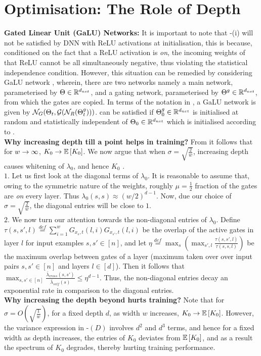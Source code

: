 \section{Optimisation: The Role of Depth}\label{sec:optimisation}
\textbf{Gated Linear Unit (GaLU) Networks:} It is important to note that -(i) will not be satisfied by DNN with ReLU activations at initialisation, this is because, conditioned on the fact that a ReLU activation is \emph{on}, the incoming weights of that ReLU cannot be all simultaneously negative, thus violating the statistical independence condition. However, this situation can be remedied by considering GaLU network \cite{sss}, wherein, there are two networks namely a main network, parameterised by $\Theta\in \mathbb{R}^{d_{net}}$, and a gating network, parameterised by ${\Theta}^g\in\mathbb{R}^{d_{net}}$, from which the gates are copied. In terms of the notation in , a GaLU network is given by $\mathcal{N}_G(\Theta_t,\mathcal{G}(\mathcal{N}_R({\Theta}^g_t)))$.
  can be satisfied if ${\Theta}^g_0\in \mathbb{R}^{d_{net}}$ is initialised at random and statistically independent of $\Theta_0\in \mathbb{R}^{d_{net}}$ which is initialised according to .\hfill\\
\textbf{Why increasing depth till a point helps in training? }From  it follows that for $w\rightarrow\infty$, $K_0\rightarrow\mathbb{E}\left[K_0\right]$. We now argue that when $\sigma=\sqrt{\frac{2}{w}}$, increasing depth causes whitening of $\lambda_0$, and hence $K_0$ .\hfill\\
$1.$ Let us first look at the diagonal terms of $\lambda_0$. It is reasonable to assume that, owing to the symmetric nature of the weights, roughly $\mu=\frac{1}{2}$ fraction of the gates are \emph{on} every layer. Thus $\lambda_0(s,s)\approx (w/2)^{d-1}$. Now, due our choice of $\sigma=\sqrt{\frac{2}{w}}$, the diagonal entries will be close to $1$.\hfill\\
$2.$ We now turn our attention towards the non-diagonal entries of $\lambda_0$. Define $\tau(s,s',l)\stackrel{def}=\sum_{i=1}^w G_{x_s,t}(l,i)G_{x_{s'},t}(l,i)$ be the overlap of the active gates in layer $l$ for input examples $s,s'\in[n]$, and  let $\eta\stackrel{def}=\max_s\left(\max_{s',l} \frac{\tau(s,s',l)}{\tau(s,s,l)}\right)$ be the maximum overlap between gates of a layer (maximum taken over over input pairs $s,s'\in[n]$ and layers $l\in [d]$).  Then it follows that $\max_{s,s'\in [n]} \frac{\bar{\lambda}_{cross}(s,s')}{\bar{\lambda}_{self}(s)}\leq \eta^{d-1}$. Thus, the non-diagonal entries decay an exponential rate in comparison to the diagonal entries.\hfill\\
\textbf{Why increasing the depth beyond hurts training?} Note that for $\sigma=O\left(\sqrt{\frac{1}{w}}\right)$, for a fixed depth $d$, as width $w$ increases, $K_0\rightarrow\mathbb{E}\left[K_0\right]$. However, the variance expression in -$(D)$ involves $d^2$ and $d^3$ terms, and hence for a fixed width as depth increases, the entries of $K_0$ deviates from $\mathbb{E}\left[K_0\right]$, and as a result the spectrum of $K_0$ degrades, thereby hurting training performance.
